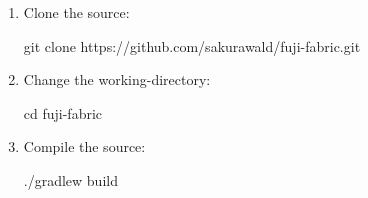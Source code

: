 \label{ch:development}


\begin{enumerate}
    \item Clone the source:
    \begin{sh}
        git clone https://github.com/sakurawald/fuji-fabric.git
    \end{sh}
    \item Change the working-directory:
    \begin{sh}
        cd fuji-fabric
    \end{sh}
    \item Compile the source:
    \begin{sh}
              ./gradlew build
    \end{sh}
\end{enumerate}
